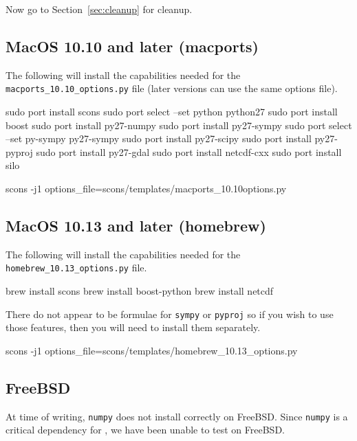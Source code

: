 \noindent Now go to Section~\ref{sec:cleanup} for cleanup.

\subsection{MacOS 10.10 and later (macports)}\label{sec:macportsrc}

The following will install the capabilities needed for the \texttt{macports_10.10_options.py} file (later versions can use the same options file).

\begin{shellCode}
sudo port install scons
sudo port select --set python python27
sudo port install boost
sudo port install py27-numpy
sudo port install py27-sympy
sudo port select --set py-sympy py27-sympy
sudo port install py27-scipy
sudo port install py27-pyproj
sudo port install py27-gdal
sudo port install netcdf-cxx
sudo port install silo
\end{shellCode}

\begin{shellCode}
scons -j1 options_file=scons/templates/macports_10.10options.py 
\end{shellCode}


\subsection{MacOS 10.13 and later (homebrew)}\label{sec:homebrewsrc}

The following will install the capabilities needed for the \texttt{homebrew_10.13_options.py} file.

\begin{shellCode}
brew install scons
brew install boost-python
brew install netcdf 
\end{shellCode}

There do not appear to be formulae for \texttt{sympy} or \texttt{pyproj} so if you wish to use those features, then
you will need to install them separately.


\begin{shellCode}
scons -j1 options_file=scons/templates/homebrew_10.13_options.py
\end{shellCode}


\subsection{FreeBSD}\label{sec:freebsdsrc}

At time of writing, \texttt{numpy} does not install correctly on FreeBSD.
Since \texttt{numpy} is a critical dependency for \escript, we have been unable to test on FreeBSD.

